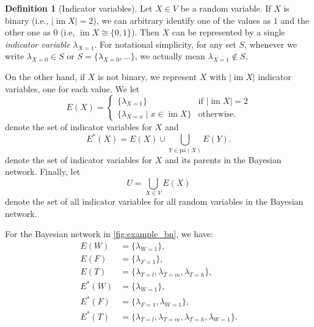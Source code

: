 \documentclass{article}
\theoremstyle{definition}
\newtheorem{definition}{Definition}
\theoremstyle{remark}
\DeclareMathOperator{\im}{im}
\begin{document}
\begin{definition}[Indicator variables]
  Let $X \in V$ be a random variable. If $X$ is binary (i.e., $|\im X| = 2$), we
  can arbitrary identify one of the values as $1$ and the other one as $0$ (i.e,
  $\im X \cong \{ 0, 1 \}$). Then $X$ can be represented by a single
  \emph{indicator variable} $\lambda_{X=1}$. For notational simplicity, for any
  set $S$, whenever we write $\lambda_{X=0} \in S$ or $S = \{ \lambda_{X=0},
  \dots \}$, we actually mean $\lambda_{X=1} \not\in S$,

  On the other hand, if $X$ is not binary, we represent $X$ with $|\im X|$
  indicator variables, one for each value. We let
  \[
    E(X) = \begin{cases}
      \{ \lambda_{X=1} \} & \text{if } |\im X| = 2 \\
      \{ \lambda_{X=x} \mid x \in \im X \} & \text{otherwise.}
    \end{cases}
  \]
  denote the set of indicator variables for $X$ and
  \[
    E^*(X) = E(X) \cup \bigcup_{Y \in \mathrm{pa}(X)} E(Y).
  \]
  denote the set of indicator variables for $X$ and its parents in the Bayesian
  network. Finally, let
  \[
    U = \bigcup_{X \in V} E(X)
  \]
  denote the set of all indicator variables for all random variables in the
  Bayesian network.
\end{definition}

For the Bayesian network in \cref{fig:example_bn}, we have:
\begin{align*}
  E(W) &= \{ \lambda_{W=1} \}, \\
  E(F) &= \{ \lambda_{F=1} \}, \\
  E(T) &= \{ \lambda_{T=l}, \lambda_{T=m}, \lambda_{T=h} \}, \\
  E^*(W) &= \{ \lambda_{W=1} \}, \\
  E^*(F) &= \{ \lambda_{F=1}, \lambda_{W=1} \}, \\
  E^*(T) &= \{ \lambda_{T=l}, \lambda_{T=m}, \lambda_{T=h}, \lambda_{W=1} \}.
\end{align*}
\end{document}
